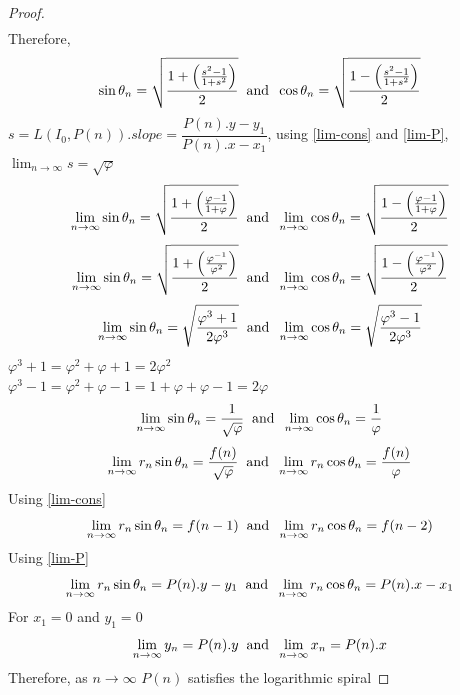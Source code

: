 \documentclass{article}
\begin{document}
\begin{proof}
\begin{align*}
\end{align*}
Therefore, $$\sin\theta_n = \sqrt{\dfrac{1 + \left(\frac{s^2-1}{1+s^2}\right)}{2}}\hspace{2mm}\text{and}\hspace{2mm}\cos\theta_n = \sqrt{\dfrac{1 - \left(\frac{s^2-1}{1+s^2}\right)}{2}}$$
$s = L(I_0, P(n)).slope = \dfrac{P(n).y - y_1}{P(n).x - x_1}$, using \ref{lim-cons} and \ref{lim-P}, $\lim_{n \to \infty} s = \sqrt{\varphi}$
$$\lim_{n \to \infty}\sin\theta_n = \sqrt{\dfrac{1 + \left(\frac{\varphi-1}{1+\varphi}\right)}{2}}\hspace{2mm}\text{and}\hspace{2mm}\lim_{n \to \infty}\cos\theta_n = \sqrt{\dfrac{1 - \left(\frac{\varphi-1}{1+\varphi}\right)}{2}}$$
$$\lim_{n \to \infty}\sin\theta_n = \sqrt{\dfrac{1 + \left(\frac{\varphi^{-1}}{\varphi^2}\right)}{2}}\hspace{2mm}\text{and}\hspace{2mm}\lim_{n \to \infty}\cos\theta_n = \sqrt{\dfrac{1 - \left(\frac{\varphi^{-1}}{\varphi^2}\right)}{2}}$$
$$\lim_{n \to \infty}\sin\theta_n = \sqrt{\dfrac{\varphi^3+1}{2\varphi^3}}\hspace{2mm}\text{and}\hspace{2mm}\lim_{n \to \infty}\cos\theta_n = \sqrt{\dfrac{\varphi^3-1}{2\varphi^3}}$$
$\varphi^3+1 = \varphi^2+\varphi+1=2\varphi^2$\\
$\varphi^3-1 = \varphi^2+\varphi-1=1+\varphi + \varphi -1 = 2\varphi$
$$\lim_{n \to \infty}\sin\theta_n = \dfrac{1}{\sqrt{\varphi}}\hspace{2mm}\text{and}\hspace{2mm}\lim_{n \to \infty}\cos\theta_n = \dfrac{1}{\varphi}$$
$$\lim_{n \to \infty}r_n\sin\theta_n = \dfrac{f(n)}{\sqrt{\varphi}}\hspace{2mm}\text{and}\hspace{2mm}\lim_{n \to \infty}r_n\cos\theta_n = \dfrac{f(n)}{\varphi}$$
Using \ref{lim-cons} $$\lim_{n \to \infty}r_n\sin\theta_n = f(n-1)\hspace{2mm}\text{and}\hspace{2mm}\lim_{n \to \infty}r_n\cos\theta_n = f(n-2)$$
Using \ref{lim-P} $$\lim_{n \to \infty}r_n\sin\theta_n = P(n).y-y_1\hspace{2mm}\text{and}\hspace{2mm}\lim_{n \to \infty}r_n\cos\theta_n = P(n).x-x_1$$
For $x_1 = 0$ and $y_1 = 0$
$$\lim_{n \to \infty}y_n = P(n).y\hspace{2mm}\text{and}\hspace{2mm}\lim_{n \to \infty}x_n = P(n).x$$
Therefore, as $n \to \infty$ $P(n)$ satisfies the logarithmic spiral
\end{proof}
\end{document}
